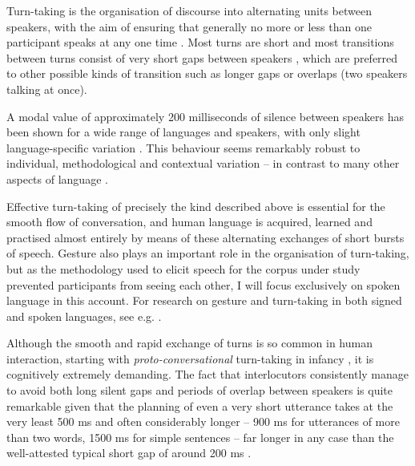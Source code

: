 Turn-taking is the organisation of discourse into alternating units between speakers, with the aim of ensuring that generally no more or less than one participant speaks at any one time \citep{sacksSimplestSystematicsOrganization1978}. Most turns are short and most transitions between turns consist of very short gaps between speakers \citep{levinsonTurntakingHumanCommunication2016}, which are preferred to other possible kinds of transition such as longer gaps or overlaps (two speakers talking at once).

A modal value of approximately 200 milliseconds of silence between speakers has been shown for a wide range of languages and speakers, with only slight language-specific variation \citep{heldnerPausesGapsOverlaps2010,stiversUniversalsCulturalVariation2009,weilhammerDurationalAspectsTurn2003,dingemanseTextTalkHarnessing2022}. This behaviour seems remarkably robust to individual, methodological and contextual variation -- in contrast to many other aspects of language \citep{christiansenCreatingLanguageIntegrating2016, evansMythLanguageUniversals2009, schegloffReflectionsLanguageDevelopment1989, sterponiRethinkingLanguageAutism2015}.

Effective turn-taking of precisely the kind described above is essential for the smooth flow of conversation, and human language is acquired, learned and practised almost entirely by means of these alternating exchanges of short bursts of speech. Gesture also plays an important role in the organisation of turn-taking, but as the methodology used to elicit speech for the corpus under study prevented participants from seeing each other, I will focus exclusively on spoken language in this account. For research on gesture and turn-taking in both signed and spoken languages, see e.g. \citet{mcclearyTurntakingBrazilianSign2013,hollerProcessingLanguageFacetoface2018,zellersProsodyHandGesture2016,bohusFacilitatingMultipartyDialog2010,demarchenaAtypicalitiesGestureForm2019}.

Although the smooth and rapid exchange of turns is so common in human interaction, starting with \textit{proto-conversational} turn-taking in infancy \citep{gratierEarlyDevelopmentTurntaking2015}, it is cognitively extremely demanding. The fact that interlocutors consistently manage to avoid both long silent gaps and periods of overlap between speakers is quite remarkable given that the planning of even a very short utterance takes at the very least 500 ms and often considerably longer -- 900 ms for utterances of more than two words, 1500 ms for simple sentences -- far longer in any case than the well-attested typical short gap of around 200 ms \citep{gleitmanGiveTakeEvent2007,griffinWhatEyesSay2000,schnurPlanningPhonologicalLevel2006,wesselingEarlyPreparationExperimentally2005}.

